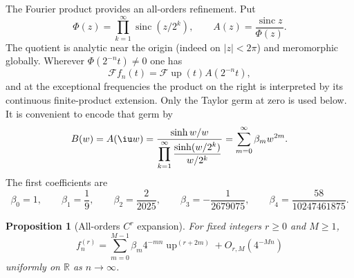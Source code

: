 \documentclass[11pt,oneside]{article}
\newtheorem{proposition}[proposition]{Proposition}
\theoremstyle{definition}
\theoremstyle{remark}
\newcommand{\R}{\mathbb R}
\newcommand{\Up}{\operatorname{up}}
\newcommand{\sinc}{\operatorname{sinc}}
\begin{document}
The Fourier product provides an all-orders refinement.  Put
\begin{equation}
 \Phi(z)=\prod_{k=1}^{\infty}\sinc(z/2^k),
 \qquad
 A(z)=\frac{\sinc z}{\Phi(z)}.
 \label{repeated2:eq:A-ratio}
\end{equation}
The quotient is analytic near the origin (indeed on $|z|<2\pi$) and meromorphic
globally.  Wherever $\Phi(2^{-n}t)\ne0$ one has
\begin{equation}
 \mathscr F f_n(t)=\mathscr F\Up(t)A(2^{-n}t),
 \label{repeated2:eq:fourier-ratio}
\end{equation}
and at the exceptional frequencies the product on the right is interpreted by its
continuous finite-product extension.  Only the Taylor germ at zero is used below.  It is
convenient to encode that germ by
\begin{equation}
 B(w)=A(\iu w)
 =\frac{\sinh w/w}{\displaystyle\prod_{k=1}^{\infty}
 \frac{\sinh(w/2^k)}{w/2^k}}
 =\sum_{m=0}^{\infty}\beta_mw^{2m}.
 \label{repeated2:eq:B-generating}
\end{equation}
The first coefficients are
\begin{equation}
 \beta_0=1,
 \qquad \beta_1=\frac19,
 \qquad \beta_2=\frac{2}{2025},
 \qquad \beta_3=-\frac1{2679075},
 \qquad \beta_4=\frac{58}{10247461875}.
 \label{repeated2:eq:beta-first}
\end{equation}

\begin{proposition}[All-orders $C^r$ expansion]
\label{repeated2:prop:all-orders-expansion}
For fixed integers $r\ge0$ and $M\ge1$,
\begin{equation}
 f_n^{(r)}
 =\sum_{m=0}^{M-1}\beta_m4^{-mn}\Up^{(r+2m)}
 +O_{r,M}(4^{-Mn})
 \label{repeated2:eq:all-orders-expansion}
\end{equation}
uniformly on $\R$ as $n\to\infty$.
\end{proposition}
\end{document}
